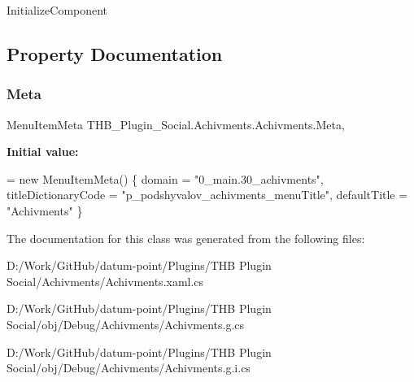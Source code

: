 Initialize\+Component 



\subsection{Property Documentation}
\mbox{\label{class_t_h_b___plugin___social_1_1_achivments_1_1_achivments_abd3121deb1475dcaa00041ac8b1a5ba4}} 
\subsubsection{\texorpdfstring{Meta}{Meta}}
{\footnotesize\ttfamily Menu\+Item\+Meta T\+H\+B\+\_\+\+Plugin\+\_\+\+Social.\+Achivments.\+Achivments.\+Meta\hspace{0.3cm}{\ttfamily [get]}, {\ttfamily [set]}}

{\bfseries Initial value\+:}
\begin{DoxyCode}
= \textcolor{keyword}{new} MenuItemMeta()
        \{
            domain = \textcolor{stringliteral}{"0\_main.30\_achivments"},
            titleDictionaryCode = \textcolor{stringliteral}{"p\_podshyvalov\_achivments\_menuTitle"},
            defaultTitle = \textcolor{stringliteral}{"Achivments"}
        \}
\end{DoxyCode}


The documentation for this class was generated from the following files\+:\begin{DoxyCompactItemize}
\item 
D\+:/\+Work/\+Git\+Hub/datum-\/point/\+Plugins/\+T\+H\+B Plugin Social/\+Achivments/Achivments.\+xaml.\+cs\item 
D\+:/\+Work/\+Git\+Hub/datum-\/point/\+Plugins/\+T\+H\+B Plugin Social/obj/\+Debug/\+Achivments/Achivments.\+g.\+cs\item 
D\+:/\+Work/\+Git\+Hub/datum-\/point/\+Plugins/\+T\+H\+B Plugin Social/obj/\+Debug/\+Achivments/Achivments.\+g.\+i.\+cs\end{DoxyCompactItemize}
